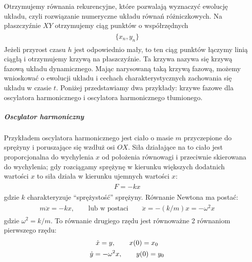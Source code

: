 \documentclass[a4paper,12pt,polish]{sphinxmanual}
\begin{document}
Otrzymujemy równania rekurencyjne, które pozwalają wyznaczyć ewolucję układu, czyli rozwiązanie numeryczne układu równań różniczkowych. Na płaszczyźnie $XY$ otrzymujemy ciąg punktów o współrzędnych
\label{ch1/chI021:equation-eqn52}\begin{gather}
\begin{split}\{x_n, y_n\}\end{split}\label{ch1/chI021-eqn52}
\end{gather}
Jeżeli przyrost czasu $h$ jest odpowiednio mały, to ten ciąg punktów łączymy linią ciągłą i otrzymujemy  krzywą na płaszczyźnie. Ta krzywa nazywa się krzywą fazową układu dynamicznego.   Mając narysowaną taką krzywą fazową, możemy wnioskować o ewolucji układu i cechach charakterystycznych zachowania się układu w czasie $t$.       Poniżej przedstawiamy dwa przykłady: krzywe fazowe dla oscylatora harmonicznego  i oscylatora harmonicznego tłumionego.


\subparagraph{Oscylator harmoniczny}
\label{ch1/chI021:oscylator-harmoniczny}
Przykładem oscylatora harmonicznego jest ciało o masie $m$ przyczepione do sprężyny i poruszające się wzdłuż osi $OX$.  Siła działające na to ciało jest proporcjonalna do wychylenia $x$ od położenia równowagi i przeciwnie skierowana do wychylenia; gdy rozciągamy sprężynę w kierunku większych dodatnich wartości $x$ to siła działa w kierunku ujemnych wartości $x$:
\label{ch1/chI021:equation-eqn53}\begin{gather}
\begin{split} F = -kx\end{split}\label{ch1/chI021-eqn53}
\end{gather}
gdzie $k$ charakteryzuje ``sprężystość'' sprężyny. Równanie Newtona ma postać:
\label{ch1/chI021:equation-eqn54}\begin{gather}
\begin{split}m\ddot x = -kx, \quad \quad \mbox{lub w postaci} \quad \quad \ddot x = -(k/m) x = -\omega^2 x\end{split}\label{ch1/chI021-eqn54}
\end{gather}
gdzie $\omega^2 = k/m$. To równanie drugiego rzędu jest równoważne 2 równaniom pierwszego rzędu:
\label{ch1/chI021:equation-eqn55}\begin{gather}
\begin{split}\dot x = y, \quad \quad x(0) = x_0\end{split}\label{ch1/chI021-eqn55}\\\begin{split}\dot y = -\omega^2 x, \quad \quad y(0) = y_0\end{split}\notag
\end{gather}
\end{document}
